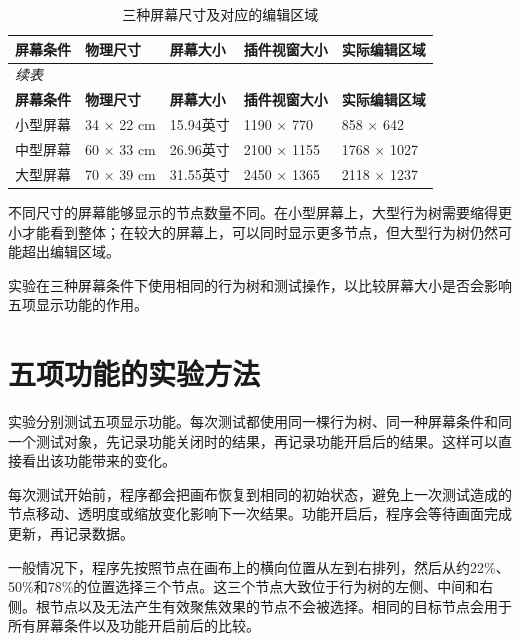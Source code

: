 \documentclass[11pt,a4paper,oneside,extrafontsizes]{memoir}
\begin{document}
\begin{center}
\small
\begin{longtable}{@{}p{} p{} p{} p{} p{}@{}}
\caption{三种屏幕尺寸及对应的编辑区域}\label{tab:auto-2}\\
\toprule
\textbf{屏幕条件} & \textbf{物理尺寸} & \textbf{屏幕大小} & \textbf{插件视窗大小} & \textbf{实际编辑区域} \\
\midrule
\endfirsthead
\multicolumn{5}{l}{\small\itshape 续表}\\
\toprule
\textbf{屏幕条件} & \textbf{物理尺寸} & \textbf{屏幕大小} & \textbf{插件视窗大小} & \textbf{实际编辑区域} \\
\midrule
\endhead
小型屏幕 & 34 × 22 cm & 15.94英寸 & 1190 × 770 & 858 × 642 \\
中型屏幕 & 60 × 33 cm & 26.96英寸 & 2100 × 1155 & 1768 × 1027 \\
大型屏幕 & 70 × 39 cm & 31.55英寸 & 2450 × 1365 & 2118 × 1237 \\
\bottomrule
\end{longtable}
\end{center}

不同尺寸的屏幕能够显示的节点数量不同。在小型屏幕上，大型行为树需要缩得更小才能看到整体；在较大的屏幕上，可以同时显示更多节点，但大型行为树仍然可能超出编辑区域。

实验在三种屏幕条件下使用相同的行为树和测试操作，以比较屏幕大小是否会影响五项显示功能的作用。

\section{五项功能的实验方法}

实验分别测试五项显示功能。每次测试都使用同一棵行为树、同一种屏幕条件和同一个测试对象，先记录功能关闭时的结果，再记录功能开启后的结果。这样可以直接看出该功能带来的变化。

每次测试开始前，程序都会把画布恢复到相同的初始状态，避免上一次测试造成的节点移动、透明度或缩放变化影响下一次结果。功能开启后，程序会等待画面完成更新，再记录数据。

一般情况下，程序先按照节点在画布上的横向位置从左到右排列，然后从约22\%、50\%和78\%的位置选择三个节点。这三个节点大致位于行为树的左侧、中间和右侧。根节点以及无法产生有效聚焦效果的节点不会被选择。相同的目标节点会用于所有屏幕条件以及功能开启前后的比较。
\end{document}

